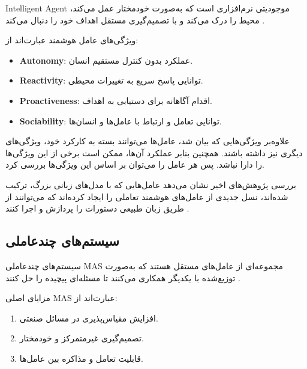 \gls{Intelligent Agent} موجودیتی نرم‌افزاری است که به‌صورت خودمختار عمل می‌کند، محیط را درک می‌کند و با تصمیم‌گیری مستقل اهداف خود را دنبال می‌کند \cite{wooldridge2009introduction}. 

ویژگی‌های عامل هوشمند عبارت‌اند از:
\begin{itemize}
	 \item \textbf{\gls{Autonomy}}: عملکرد بدون کنترل مستقیم انسان.
	\item \textbf{\gls{Reactivity}}: توانایی پاسخ سریع به تغییرات محیطی.
	\item \textbf{\gls{Proactiveness}}: اقدام آگاهانه برای دستیابی به اهداف.
	\item \textbf{\gls{Sociability}}: توانایی تعامل و ارتباط با عامل‌ها و انسان‌ها.
\end{itemize}

علاوه‌بر ویژگی‌هایی که بیان شد، عامل‌ها می‌توانند بسته به کارکرد خود، ویژگی‌های دیگری نیز داشته باشند. همچنین بنابر عملکرد آن‌ها، ممکن است برخی از این ویژگی‌ها را دارا نباشد. پس هر عامل را می‌توان بر اساس این ویژگی‌ها بررسی کرد.

بررسی پژوهش‌های اخیر نشان می‌دهد عامل‌هایی که با مدل‌های زبانی بزرگ، ترکیب شده‌اند، نسل جدیدی از عامل‌های هوشمند تعاملی را ایجاد کرده‌اند که می‌توانند از طریق زبان طبیعی دستورات را پردازش و اجرا کنند \cite{park2025interactive}.


\subsection{سیستم‌های چندعاملی}

سیستم‌های چندعاملی \gls{MAS} مجموعه‌ای از عامل‌های مستقل هستند که به‌صورت توزیع‌شده با یکدیگر همکاری می‌کنند تا مسئله‌ای پیچیده را حل کنند \cite{dorri2018multiagent,bellifemine2007jade}. 

مزایای اصلی \gls{MAS} عبارت‌اند از:
\begin{enumerate}
	\item افزایش مقیاس‌پذیری در مسائل صنعتی.
	\item تصمیم‌گیری غیرمتمرکز و خودمختار.
	\item قابلیت تعامل و مذاکره بین عامل‌ها.
\end{enumerate}

